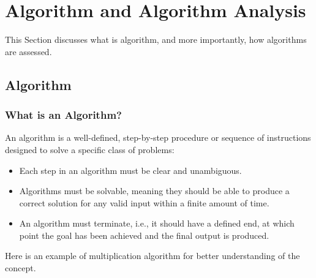 \documentclass[
	12pt, %
	fleqn, %
	a4paper, %
]{LegrandOrangeBook}
\begin{document}

\section{Algorithm and Algorithm Analysis}
	This Section discusses what is algorithm, and more importantly, how algorithms
	are assessed.

    \subsection{Algorithm}
    \subsubsection{What is an Algorithm?}
    \begin{definition}[Algorithm] \label{def:algo}
        An algorithm is a well-defined, step-by-step procedure or sequence of instructions designed to solve a specific class of problems:
        \begin{itemize}
            \item Each step in an algorithm must be clear and unambiguous. 
            \item Algorithms must be solvable, meaning they should be able to produce a correct solution for any valid input within a finite amount of time.
            \item An algorithm must terminate, i.e., it should have a defined end, at which point the goal has been achieved and the final output is produced.
        \end{itemize} 
    \end{definition}
    Here is an example of multiplication algorithm for better understanding of the concept.
\end{document}
